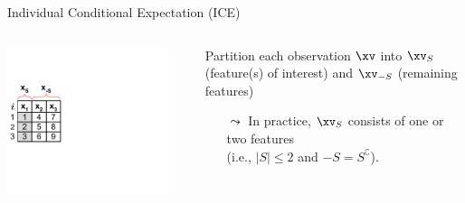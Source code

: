 \documentclass[10pt,compress,t,notes=noshow, xcolor=table]{beamer}
\begin{document}
\begin{frame}[c]{Individual Conditional Expectation (ICE) }

\begin{columns}[T, totalwidth=\textwidth]
\begin{column}{0.16\textwidth} %
\includegraphics[page=1, trim=0cm 0.35cm 4.53cm 0.35cm, clip, width=0.9\textwidth]{../../figure_man/ice_plot_demo}
\end{column}
\begin{column}{0.84\textwidth}


Partition each observation $\xv$ into $\xv_S$ (feature(s) of interest) and $\xv_{-S}$ (remaining features)
\begin{itemize}
    \item[$\leadsto$] In practice, $\xv_S$ consists of one or two features \\ (i.e., $|S| \leq 2$ and ${-S} = S^\complement$).
\end{itemize}


\end{column}
\end{columns}
\end{frame}
\end{document}
